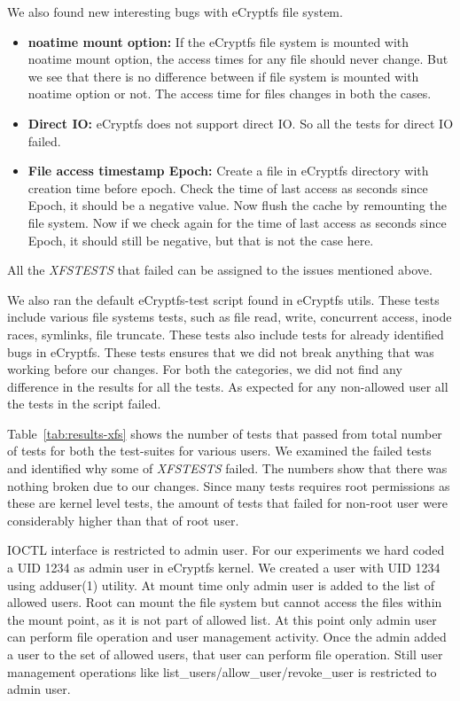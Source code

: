 We also found new interesting bugs with eCryptfs file system.
\begin{itemize}
\item 
\textbf{noatime mount option:} If the eCryptfs file system is mounted
with noatime mount option, the access times for any file should never
change.  But we see that there is no difference between if file system
is mounted with noatime option or not.  The access time for files
changes in both the cases.

\item
\textbf{Direct IO:} eCryptfs does not support direct IO.  So all the
tests for direct IO failed.
\item
\textbf{File access timestamp Epoch:} Create a file in eCryptfs
directory with creation time before epoch.  Check the time of last
access as seconds since Epoch, it should be a negative value.  Now
flush the cache by remounting the file system.  Now if we check again
for the time of last access as seconds since Epoch, it should still be
negative, but that is not the case here.
\end{itemize}

All the \emph{XFSTESTS} that failed can be assigned to the issues
mentioned above.

We also ran the default eCryptfs-test script found in eCryptfs utils.
These tests include various file systems tests, such as file read,
write, concurrent access, inode races, symlinks, file truncate.  These
tests also include tests for already identified bugs in eCryptfs.
These tests ensures that we did not break anything that was working
before our changes.  For both the categories, we did not find any
difference in the results for all the tests.  As expected for any
non-allowed user all the tests in the script failed.

Table~\ref{tab:results-xfs} shows the number of tests that passed from
total number of tests for both the test-suites for various users.  We
examined the failed tests and identified why some of \emph{XFSTESTS}
failed.  The numbers show that there was nothing broken due to our
changes.  Since many tests requires root permissions as these are
kernel level tests, the amount of tests that failed for non-root user
were considerably higher than that of root user.

IOCTL interface is restricted to admin user.  For our experiments we
hard coded a UID \mbox{1234} as admin user in eCryptfs kernel.  We
created a user with UID \mbox{1234} using adduser(1) utility.  At
mount time only admin user is added to the list of allowed users.
Root can mount the file system but cannot access the files within the
mount point, as it is not part of allowed list.  At this point only
admin user can perform file operation and user management activity.
Once the admin added a user to the set of allowed users, that user can
perform file operation.  Still user management operations like
list\_users/allow\_user/revoke\_user is restricted to admin user.


